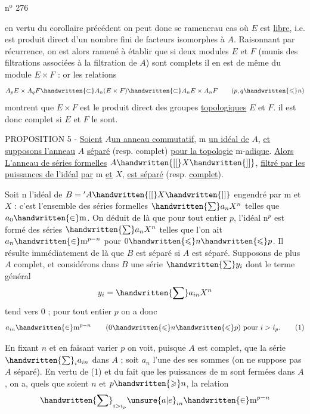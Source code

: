 \hfill n$^{\mathrm{o}}$ 276

en vertu du corollaire précédent on peut donc se ramener\handwritten{/}au cas où $E$ est \uline{libre}, i.e. est produit direct d'un nombre fini de facteurs isomorphes à $A$. Raisonnant par récurrence, on est alors ramené à établir que si deux modules $E$ et $F$ (munis des filtrations associées à la filtration de $A$) sont complets il en est de même du module $E\times F$ : or les relations
\[
A_p E\times A_q F\handwritten{\subset} A_n(E\times F)\handwritten{\subset} A_n E\times A_n F\qquad(p,q\handwritten{\leqslant} n)
\]
montrent que $E\times F$ est le produit direct des groupes \uline{topologiques} $E$ et $F$. il est donc complet si $E$ et $F$ le sont.

PROPOSITION 5 - \uline{Soient} $A$\uline{un anneau commutatif}, $\mathrm{m}$ \uline{un idéal de} $A$, \uline{et supposons l'anneau} $A$ \uline{séparé} (resp. complet) \uline{pour la topologie} $\mathrm{m}$-\uline{adique}. \uline{Alors L'anneau de séries formelles} $A\handwritten{[[}X\handwritten{]]}$, \uline{filtré par les puissances de l'idéal}  \uline{par} $\mathrm{m}$ \uline{et} $X$, \uline{est séparé} (resp. \uline{complet}).

Soit $\mathrm{n}$ l'idéal de $B={}'A\handwritten{[[}X\handwritten{]]}$ engendré par $\mathrm{m}$ et $X$ : c'est l'ensemble des séries formelles $\handwritten{\sum} a_n X^n$ telles que $a_0\handwritten{\in}\mathrm{m}$. On déduit de là que pour tout entier $p$, l'idéal $\mathrm{n}^p$ est formé des séries $\handwritten{\sum} a_n X^n$ telles que l'on ait $a_n\handwritten{\in}\mathrm{m}^{p-n}$ pour $0\handwritten{\leqslant} n\handwritten{\leqslant} p$. Il résulte immédiatement de là que $B$ est séparé si $A$ est séparé. Supposons de plus $A$ complet, et considérons dans $B$ une série $\handwritten{\sum} y_i$ dont le terme général
\[
y_i=\handwritten{\sum} a_{in}X^n
\]
tend vers 0 ; pour tout entier $p$ on a donc
\begingroup\makeatletter\tagsleft@true\makeatother
\[
a_{in}\handwritten{\in}\mathrm{m}^{p-n}\qquad(0\handwritten{\leqslant} n\handwritten{\leqslant} p)\ \text{pour }i>i_p.\tag*{(1)}
\]
\endgroup

En fixant $n$ et en faisant varier $p$ on voit, puisque $A$ est complet, que la série $\handwritten{\sum}_i a_{in}$  dans $A$ ; soit $a_n$ l'une des ses sommes (on ne suppose pas $A$ séparé). En vertu de (1) et du fait que les puissances de $\mathrm{m}$ sont fermées dans $A$, on a, quels que soient $n$ et $p\handwritten{\geqslant} n$, la relation
\[
\handwritten{\sum}_{i>i_p}\unsure{a|e}_{in}\handwritten{\in}\mathrm{m}^{p-n}
\]

